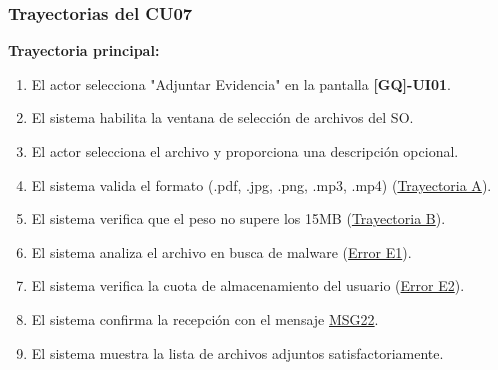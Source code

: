 \begin{appendices}
\subsubsection{Trayectorias del CU07}
\textbf{Trayectoria principal:}
\begin{enumerate}[nosep]
    \item El actor selecciona "Adjuntar Evidencia" en la pantalla \textbf{[GQ]-UI01}.
    \item El sistema habilita la ventana de selección de archivos del SO.
    \item El actor selecciona el archivo y proporciona una descripción opcional.
    \item El sistema valida el formato (.pdf, .jpg, .png, .mp3, .mp4) (\hyperlink{msg:MSG23}{Trayectoria A}).
    \item El sistema verifica que el peso no supere los 15MB (\hyperlink{msg:MSG24}{Trayectoria B}).
    \item El sistema analiza el archivo en busca de malware (\hyperlink{err:E12}{Error E1}).
    \item El sistema verifica la cuota de almacenamiento del usuario (\hyperlink{err:E13}{Error E2}).
    \item El sistema confirma la recepción con el mensaje \hyperlink{msg:MSG22}{MSG22}.
    \item El sistema muestra la lista de archivos adjuntos satisfactoriamente.
\end{enumerate}


\end{appendices}
